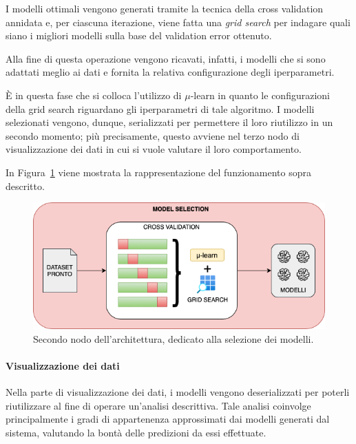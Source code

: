 \documentclass[12pt]{report}
\theoremstyle{definition}
\begin{document}
I modelli ottimali vengono generati tramite la tecnica della cross validation annidata e, per ciascuna iterazione, viene fatta una \textit{grid search} per indagare quali siano i migliori modelli sulla base del validation error ottenuto.

Alla fine di questa operazione vengono ricavati, infatti, i modelli che si sono adattati meglio ai dati e fornita la relativa configurazione degli iperparametri.

\`E in questa fase che si colloca l'utilizzo di $\mu$-learn in quanto le configurazioni della grid search riguardano gli iperparametri di tale algoritmo.
I modelli selezionati vengono, dunque, serializzati per permettere il loro riutilizzo in un secondo momento; più precisamente, questo avviene nel terzo nodo di visualizzazione dei dati in cui si vuole valutare il loro comportamento.

In Figura~\ref{selectionmodel} viene mostrata la rappresentazione del funzionamento sopra descritto.
\begin{figure}
    \centering
    \includegraphics[scale=0.6]{images/modelselectionmodule.png}
    \caption{Secondo nodo dell'architettura, dedicato alla selezione dei modelli.}
    \label{selectionmodel}
\end{figure}

\paragraph{Visualizzazione dei dati} 
Nella parte di visualizzazione dei dati, i modelli vengono deserializzati per poterli riutilizzare al fine di operare un'analisi descrittiva.
Tale analisi coinvolge principalmente i gradi di appartenenza approssimati dai modelli generati dal sistema, valutando la bontà delle predizioni da essi effettuate.
\end{document}
